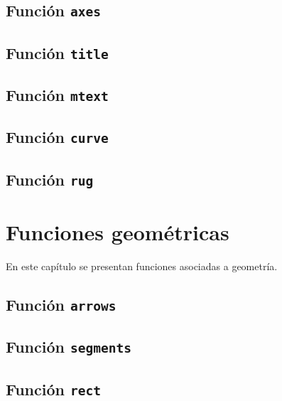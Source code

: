 \documentclass[10pt,]{krantz}
\begin{document}
\section{\texorpdfstring{Función \texttt{axes} 
}{Función axes  }}\label{funcion-axes}

\section{\texorpdfstring{Función \texttt{title} 
}{Función title  }}\label{funcion-title}

\section{\texorpdfstring{Función \texttt{mtext}
}{Función mtext }}\label{funcion-mtext}

\section{\texorpdfstring{Función \texttt{curve} 
}{Función curve  }}\label{funcion-curve}

\section{\texorpdfstring{Función \texttt{rug}
}{Función rug }}\label{funcion-rug}

\chapter{Funciones geométricas}\label{funciones-geometricas}

En este capítulo se presentan funciones asociadas a geometría.

\section{\texorpdfstring{Función \texttt{arrows} 
}{Función arrows  }}\label{funcion-arrows}

\section{\texorpdfstring{Función \texttt{segments} 
}{Función segments  }}\label{funcion-segments}

\section{\texorpdfstring{Función \texttt{rect} 
}{Función rect  }}\label{funcion-rect}
\end{document}

